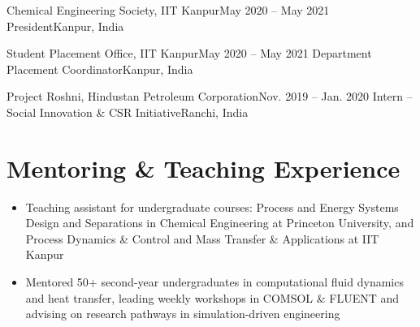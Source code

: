 \documentclass{resume}
\begin{document}
    \researchHeading
      {Chemical Engineering Society, \textnormal{IIT Kanpur}}{May 2020 -- May 2021}
      {President}{Kanpur, India}
      \resumeItemListStart
      \resumeItemListEnd

    \vspace{\entryspacing}
    \researchHeading
      {Student Placement Office, \textnormal{IIT Kanpur}}{May 2020 -- May 2021}
      {Department Placement Coordinator}{Kanpur, India}
      \resumeItemListStart
      \resumeItemListEnd

    \vspace{\entryspacing}
    \researchHeading
      {Project Roshni, \textnormal{Hindustan Petroleum Corporation}}{Nov. 2019 -- Jan. 2020}
      {Intern -- Social Innovation \& CSR Initiative}{Ranchi, India}
      \resumeItemListStart
      \resumeItemListEnd

  \resumeSubHeadingListEnd


\section{\bfseries Mentoring \& Teaching Experience}
 \begin{itemize}[leftmargin=0.15in, label={$\vcenter{\hbox{\tiny$\bullet$}}$}, itemsep=0pt, parsep=2pt]
    \small
    \item Teaching assistant for undergraduate courses: Process and Energy Systems Design and Separations in Chemical Engineering at Princeton University, and Process Dynamics \& Control and Mass Transfer \& Applications at IIT Kanpur
    \item Mentored 50+ second-year undergraduates in computational fluid dynamics and heat transfer, leading weekly workshops in COMSOL \& FLUENT and advising on research pathways in simulation-driven engineering
  \end{itemize}
\end{document}
